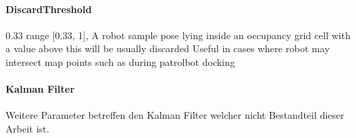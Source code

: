 \documentclass{article}
\begin{document}
\paragraph{DiscardThreshold} 0.33     range [0.33, 1],  A robot sample pose lying inside
                          an occupancy grid cell with a value above this will
                          be usually discarded Useful in cases where robot may
                          intersect map points such as during patrolbot
                          docking
\paragraph{Kalman Filter}
Weitere Parameter betreffen den Kalman Filter welcher nicht Bestandteil dieser Arbeit ist. 



\end{document}

